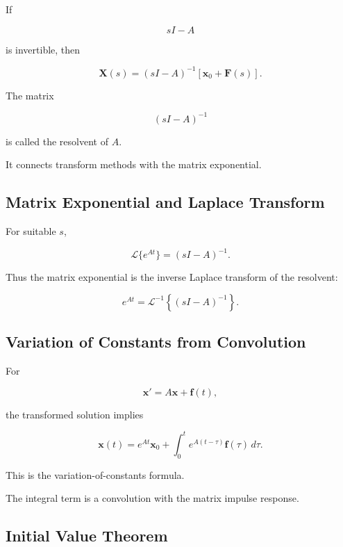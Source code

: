 If

\[
sI-A
\]

is invertible, then

\[
\boxed{
\mathbf{X}(s)
=
(
sI-A
)^{-1}
[
\mathbf{x}_0+\mathbf{F}(s)
].
}
\]

The matrix

\[
\boxed{
(
sI-A
)^{-1}
}
\]

is called the resolvent of \(A\).

It connects transform methods with the matrix exponential.

\subsection{Matrix Exponential and Laplace Transform}
\label{subsec:matrix-exponential-laplace}

For suitable \(s\),

\[
\boxed{
\mathcal{L}
\{
e^{At}
\}
=
(
sI-A
)^{-1}.
}
\]

Thus the matrix exponential is the inverse Laplace transform of the
resolvent:

\[
\boxed{
e^{At}
=
\mathcal{L}^{-1}
\left\{
(
sI-A
)^{-1}
\right\}.
}
\]

\subsection{Variation of Constants from Convolution}
\label{subsec:variation-constants-transform}

For

\[
\mathbf{x}'
=
A\mathbf{x}
+
\mathbf{f}(t),
\]

the transformed solution implies

\[
\boxed{
\mathbf{x}(t)
=
e^{At}\mathbf{x}_0
+
\int_0^t
e^{A(t-\tau)}
\mathbf{f}(\tau)
\,d\tau.
}
\]

This is the variation-of-constants formula.

The integral term is a convolution with the matrix impulse response.

\subsection{Initial Value Theorem}
\label{subsec:initial-value-theorem}


